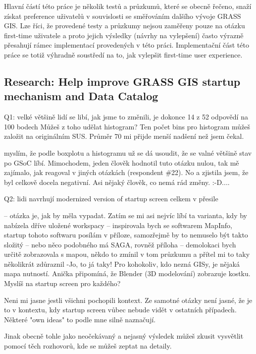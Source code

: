 \documentclass[a4paper,10pt,twoside]{article}
\begin{document}
\noindent Hlavní částí této práce je několik testů a průzkumů, které se obecně řečeno, snaží získat preference uživatelů v souvislosti se směřováním dalšího vývoje GRASS GIS. Lze říci, že provedené testy a průzkumy nejsou zaměřeny pouze na otázku first-time uživatele a proto jejich výsledky (návrhy na vylepšení) často výrazně přesahují rámec implementací provedených v této práci. Implementační část této práce se totiž výhradně soustředí na to, jak vylepšit first-time user experience. 

\subsection{Research: Help improve GRASS GIS startup mechanism and Data Catalog}

    Q1: velké většině lidí se libí, jak jsme to změnili, je dokonce 14 z 52 odpovědí na 100 bodech
    Můžeš z toho udělat histogram? Ten počet bins pro histogram můžeš založit na originálním SUS. Průměr 70 mi přijde menší nadšení než jsem čekal. 
    
    myslím, že podle boxplotu a histogramu už se dá usoudit, že se valné většině stav po GSoC líbí. 
Mimochodem, jeden člověk hodnotil tuto otázku nulou, tak mě zajímalo, jak reagoval v jiných otázkách (respondent \#22). No a zjistila jsem, že byl celkově docela negativní. Asi nějaký člověk, co nemá rád změny. :-D.... 


    Q2: lidi navrhují modernized version of startup screen celkem v přesile

    -- otázka je, jak by měla vypadat. Zatím se mi asi nejvíc líbí ta varianta, kdy by nabízela dříve uložené workspacy
    -- inspirovala bych se softwarem MapInfo, startup tohoto softwaru posílám v příloze, samozřejmě by to nemuselo být takto složitý
    -- nebo něco podobného má SAGA, rovněž příloha
    -- demolokaci bych určitě zobrazovala s mapou, někdo to zmínil v tom průzkumu a přítel mi to taky několikrát zdůraznil -Jo, to já taky! Pro kohokoliv, kdo nezná GISy, je nějaká mapa nutností. Anička připomíná, že Blender (3D modelování) zobrazuje kostku.
    Myslíš na startup screen pro každého?
    
    Neni mi jasne jestli všichni pochopili kontext. Ze samotné otázky není jasné, že je to v kontextu, kdy startup screen vůbec nebude vidět v ostatních případech. Některé "own ideas" to podle mne silně naznačují.

Jinak obecně tohle jako neočekávaný a nejasný výsledek můžeš zkusit vysvětlit pomocí těch rozhovorů, kde se můžeš zeptat na detaily.
\end{document}
